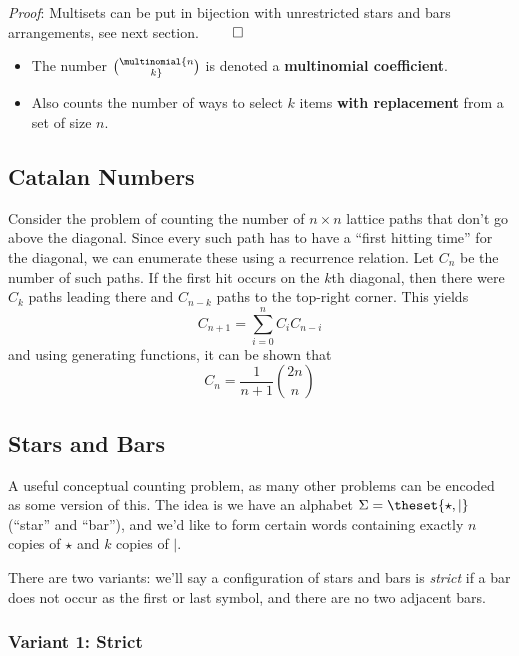 \emph{Proof}: Multisets can be put in bijection with unrestricted stars
and bars arrangements, see next section. \(\qed\)

\begin{itemize}
\tightlist
\item
  The number \(\multinomial{n\choose k}\) is denoted a
  \textbf{multinomial coefficient}.
\item
  Also counts the number of ways to select \(k\) items \textbf{with
  replacement} from a set of size \(n\).
\end{itemize}

\hypertarget{catalan-numbers}{%
\subsection{Catalan Numbers}\label{catalan-numbers}}

Consider the problem of counting the number of \(n\times n\) lattice
paths that don't go above the diagonal. Since every such path has to
have a ``first hitting time'' for the diagonal, we can enumerate these
using a recurrence relation. Let \(C_n\) be the number of such paths. If
the first hit occurs on the \(k\)th diagonal, then there were \(C_k\)
paths leading there and \(C_{n-k}\) paths to the top-right corner. This
yields \[
C_{n+1} = \sum_{i=0}^n C_i C_{n-i}
\] and using generating functions, it can be shown that \[
C_n = \frac{1}{n+1}{2n \choose n}
\]

\hypertarget{stars-and-bars}{%
\subsection{Stars and Bars}\label{stars-and-bars}}

A useful conceptual counting problem, as many other problems can be
encoded as some version of this. The idea is we have an alphabet
\(\Sigma = \theset{\star, \mid}\) (``star'' and ``bar''), and we'd like
to form certain words containing exactly \(n\) copies of \(\star\) and
\(k\) copies of \(\mid\).

There are two variants: we'll say a configuration of stars and bars is
\emph{strict} if a bar does not occur as the first or last symbol, and
there are no two adjacent bars.

\hypertarget{variant-1-strict}{%
\subsubsection{Variant 1: Strict}\label{variant-1-strict}}

